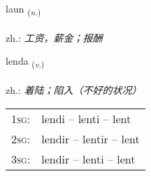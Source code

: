 \documentclass[frontgrid, backgrid]{flacards}\usepackage[]{graphicx}\usepackage[]{xcolor}
\begin{document}
\renewcommand{\flhead}{\vskip5pt \fboxsep=0pt {\small\bfseries\footnotesize Nafnorð | 名词}}
\renewcommand{\fcfoot}{\vskip5pt \fboxsep=0pt \hspace{2pt}{\small\bfseries\footnotesize 1K}}

\renewcommand{\blhead}{\vskip5pt {\small\bfseries\footnotesize Nafnorð | 名词 }}
\renewcommand{\bcfoot}{\vskip5pt \hspace{2pt}{\small\bfseries\footnotesize 1K}}


{laun \small{\textsubscript{(\textit{n.})}} \\[1ex] %
\textphonetic{[lœiːn]} \\
zh.: \emph{工资，薪金；报酬} \\  [2ex]
\renewcommand*{\arraystretch}{0.8}
}

\renewcommand{\flhead}{\vskip5pt \fboxsep=0pt {\small\bfseries\footnotesize Sagnorð | 动词}}
\renewcommand{\fcfoot}{\vskip5pt \fboxsep=0pt \hspace{2pt}{\small\bfseries\footnotesize 1K}}

\renewcommand{\blhead}{\vskip5pt {\small\bfseries\footnotesize Sagnorð | 动词 }}
\renewcommand{\bcfoot}{\vskip5pt \hspace{2pt}{\small\bfseries\footnotesize 1K}}


{lenda \small{\textsubscript{(\textit{v.})}} \\[1ex] %
\textphonetic{[lɛnta]} \\
zh.: \emph{着陆；陷入（不好的状况）} \\  [2ex]
\renewcommand*{\arraystretch}{0.8}
\begin{tabular}{p{1cm}l}
\textsc{1sg}: & lendi -- lenti -- lent \\ 
\textsc{2sg}: & lendir -- lentir -- lent \\ 
\textsc{3sg}: & lendir -- lenti -- lent \\ 
\end{tabular}
}
\end{document}
